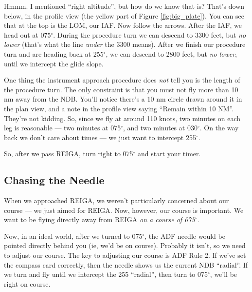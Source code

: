 Hmmm.  I mentioned ``right altitude'', but how do we know that is?
That's down below, in the profile view (the yellow part of Figure
\ref{fig:big_plate}).  You can see that at the top is the LOM, our
IAF.  Now follow the arrows.  After the IAF, we head out at
075$^\circ$.  During the procedure turn we can descend to 3300 feet,
but \emph{no lower} (that's what the line \emph{under} the 3300
means).  After we finish our procedure turn and are heading back at
255$^\circ$, we can descend to 2800 feet, but \emph{no lower}, until
we intercept the glide slope.

One thing the instrument approach procedure does \emph{not} tell you
is the length of the procedure turn.  The only constraint is that you
must not fly more than 10 nm away from the NDB.  You'll notice there's
a 10 nm circle drawn around it in the plan view, and a note in the
profile view saying ``Remain within 10 NM''.  They're not kidding.
So, since we fly at around 110 knots, two minutes on each leg is
reasonable --- two minutes at 075$^\circ$, and two minutes at
030$^\circ$.  On the way back we don't care about times --- we just
want to intercept 255$^\circ$.

So, after we pass REIGA, turn right to 075$^\circ$ and start your
timer.

\subsection{Chasing the Needle}


When we approached REIGA, we weren't particularly concerned about our
course --- we just aimed for REIGA.  Now, however, our course is
important.  We want to be flying directly away from REIGA \emph{on a
  course of 075$^\circ$}.

Now, in an ideal world, after we turned to 075$^\circ$, the ADF needle
would be pointed directly behind you (ie, we'd be on course).
Probably it isn't, so we need to adjust our course.  The key to
adjusting our course is ADF Rule 2.  If we've set the compass card
correctly, then the needle shows us the current NDB ``radial''.  If we
turn and fly until we intercept the 255 ``radial'', then turn to
075$^\circ$, we'll be right on course.


